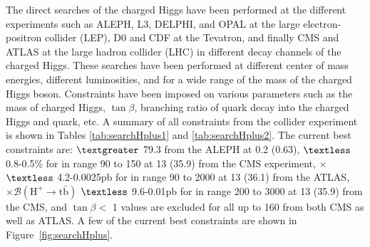 The direct searches of the charged Higgs have been performed at the different
experiments such as ALEPH, L3, DELPHI, and OPAL at the large electron-positron 
collider (LEP), D0 and CDF at the Tevatron, and finally CMS and ATLAS at the large hadron
collider (LHC) in different decay channels of the charged Higgs. These searches
have been performed at different center of mass energies, different luminosities,
and for a wide range of the mass of the charged Higgs boson. Constraints have
been imposed on various parameters such as the mass of charged Higgs, $\tan\beta$, 
branching ratio of \PQt quark decay into the charged Higgs and \PQb quark, etc. A 
summary of all constraints from the collider experiment is shown in Tables 
\ref{tab:searchHplus1} and \ref{tab:searchHplus2}. The current best constraints 
are: \mHp $\textgreater$ 79.3 \GeV from the ALEPH at 0.2 \TeV (0.63\fbinv), 
\brThb $\textless$ 0.8-0.5\% for \mHp in range 90 to 150 \GeV at 13 \TeV 
(35.9\fbinv) from the CMS experiment, \sigHp $\times$ \brHtv $\textless$ 
4.2-0.0025\unit{pb} for \mHp in range 90 to 2000 \GeV at 13 \TeV (36.1\fbinv) from 
the ATLAS, \sigHp $\times \mathcal{B}(\text{H}^+ \rightarrow \text{t}\bar{\text{b}})$  $\textless$ 
9.6-0.01\unit{pb} for \mHp in range 200 to 3000 \GeV at 13 \TeV (35.9\fbinv) from 
the CMS, and $\tan\beta < $ 1 values are excluded for all \mHp up to 
160 \GeV from both CMS as well as ATLAS. A few of the current best constraints 
are shown in Figure~\ref{fig:searchHplus}.
